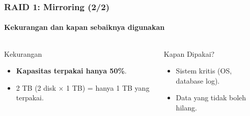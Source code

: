 \documentclass[t,aspectratio=169,xcolor=dvipsnames]{beamer}
\begin{document}
\begin{frame}[shrink=5]
\begin{columns}[T]
\begin{center}
        \end{center}
    \end{columns}
\end{frame}

\begin{frame}[shrink=5]
    \frametitle{RAID 1: Mirroring (2/2)}
    \framesubtitle{Kekurangan dan kapan sebaiknya digunakan}

    \begin{columns}[T]
        \begin{alertblock}{Kekurangan}
            \small
            \begin{itemize}
                \item \textbf{Kapasitas terpakai hanya 50\%}.
                \item 2 TB (2 disk $\times$ 1 TB) = hanya 1 TB yang terpakai.
            \end{itemize}
        \end{alertblock}

        \begin{block}{Kapan Dipakai?}
            \small
            \begin{itemize}
                \item Sistem kritis (OS, database log).
                \item Data yang tidak boleh hilang.
            \end{itemize}
        \end{block}
    \end{columns}
\end{frame}
\end{document}
